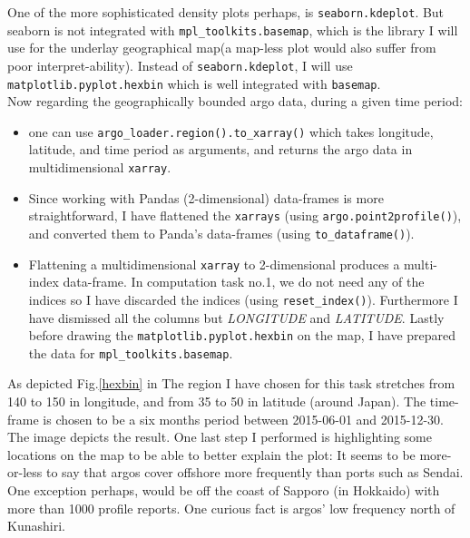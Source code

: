 \documentclass[12pt]{article}
\begin{document}
One of the more sophisticated density plots perhaps, is 
\verb|seaborn.kdeplot|. 
But seaborn is not integrated with \verb|mpl_toolkits.basemap|,
which is the library I will use for the underlay geographical 
map(a map-less plot would also suffer from poor interpret-ability). 
Instead of \verb|seaborn.kdeplot|, I will use 
\verb|matplotlib.pyplot.hexbin| which
is well integrated with \verb|basemap|.\\

Now regarding the geographically bounded argo data, 
during a given time period:
 \begin{itemize}
     \item one can use \verb|argo_loader.region().to_xarray()| which takes longitude, latitude, and time period as arguments, and 
     returns the argo data in multidimensional \verb|xarray|.
     \item Since working
     with Pandas (2-dimensional) data-frames is more straightforward, 
     I have flattened the \verb|xarrays| 
     (using \verb|argo.point2profile()|),
     and converted them to Panda's data-frames 
     (using \verb|to_dataframe()|).
     \item Flattening a multidimensional \verb|xarray| to 
     2-dimensional produces a multi-index data-frame. 
     In computation task no.1, 
     we do not need any of the indices so I have discarded 
     the indices (using \verb|reset_index()|). Furthermore I 
     have dismissed all
     the columns but \textit{LONGITUDE} and \textit{LATITUDE}. 
     Lastly before 
     drawing the \verb|matplotlib.pyplot.hexbin| on the map, I have
     prepared the data for \verb|mpl_toolkits.basemap|.
 \end{itemize}

 As depicted Fig.\ref{hexbin} in The region I have chosen for 
 this task stretches from 140 to 150 
 in longitude, and from 35 to 50 in latitude (around Japan). 
 The time-frame is chosen to be a six months period between 
 2015-06-01 and 2015-12-30. The image depicts the result. One
 last step I performed is highlighting some locations on the map 
 to be able to better explain the plot: It seems to be
 more-or-less to say that argos cover offshore more frequently 
 than ports such as Sendai. One exception perhaps, would be
 off the coast of Sapporo (in Hokkaido) with more than 1000 profile 
 reports. One curious fact is argos' low frequency north of Kunashiri.    
\end{document}
